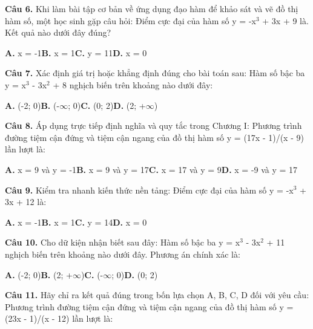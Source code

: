 \documentclass[11pt,a4paper]{article}
\begin{document}
\textbf{\color{primary} Câu 6.} Khi làm bài tập cơ bản về ứng dụng đạo hàm để khảo sát và vẽ đồ thị hàm số, một học sinh gặp câu hỏi: Điểm cực đại của hàm số y = -x$^3$ + 3x + 9 là. Kết quả nào dưới đây đúng?\par
\hspace*{1.5em}\textbf{A.} x = -1\quad\quad \textbf{B.} x = 1\quad\quad \textbf{C.} y = 11\quad\quad \textbf{D.} x = 0\par\vspace{2pt}
\textbf{\color{primary} Câu 7.} Xác định giá trị hoặc khẳng định đúng cho bài toán sau: Hàm số bậc ba y = x$^3$ - 3x$^2$ + 8 nghịch biến trên khoảng nào dưới đây:\par
\hspace*{1.5em}\textbf{A.} (-2; 0)\quad\quad \textbf{B.} (-$\infty$; 0)\quad\quad \textbf{C.} (0; 2)\quad\quad \textbf{D.} (2; +$\infty$)\par\vspace{2pt}
\textbf{\color{primary} Câu 8.} Áp dụng trực tiếp định nghĩa và quy tắc trong Chương I: Phương trình đường tiệm cận đứng và tiệm cận ngang của đồ thị hàm số y = (17x - 1)/(x - 9) lần lượt là:\par
\hspace*{1.5em}\textbf{A.} x = 9 và y = -1\quad\quad \textbf{B.} x = 9 và y = 17\quad\quad \textbf{C.} x = 17 và y = 9\quad\quad \textbf{D.} x = -9 và y = 17\par\vspace{2pt}
\textbf{\color{primary} Câu 9.} Kiểm tra nhanh kiến thức nền tảng: Điểm cực đại của hàm số y = -x$^3$ + 3x + 12 là:\par
\hspace*{1.5em}\textbf{A.} x = -1\quad\quad \textbf{B.} x = 1\quad\quad \textbf{C.} y = 14\quad\quad \textbf{D.} x = 0\par\vspace{2pt}
\textbf{\color{primary} Câu 10.} Cho dữ kiện nhận biết sau đây: Hàm số bậc ba y = x$^3$ - 3x$^2$ + 11 nghịch biến trên khoảng nào dưới đây. Phương án chính xác là:\par
\hspace*{1.5em}\textbf{A.} (-2; 0)\quad\quad \textbf{B.} (2; +$\infty$)\quad\quad \textbf{C.} (-$\infty$; 0)\quad\quad \textbf{D.} (0; 2)\par\vspace{2pt}
\textbf{\color{primary} Câu 11.} Hãy chỉ ra kết quả đúng trong bốn lựa chọn A, B, C, D đối với yêu cầu: Phương trình đường tiệm cận đứng và tiệm cận ngang của đồ thị hàm số y = (23x - 1)/(x - 12) lần lượt là:\par
\end{document}

